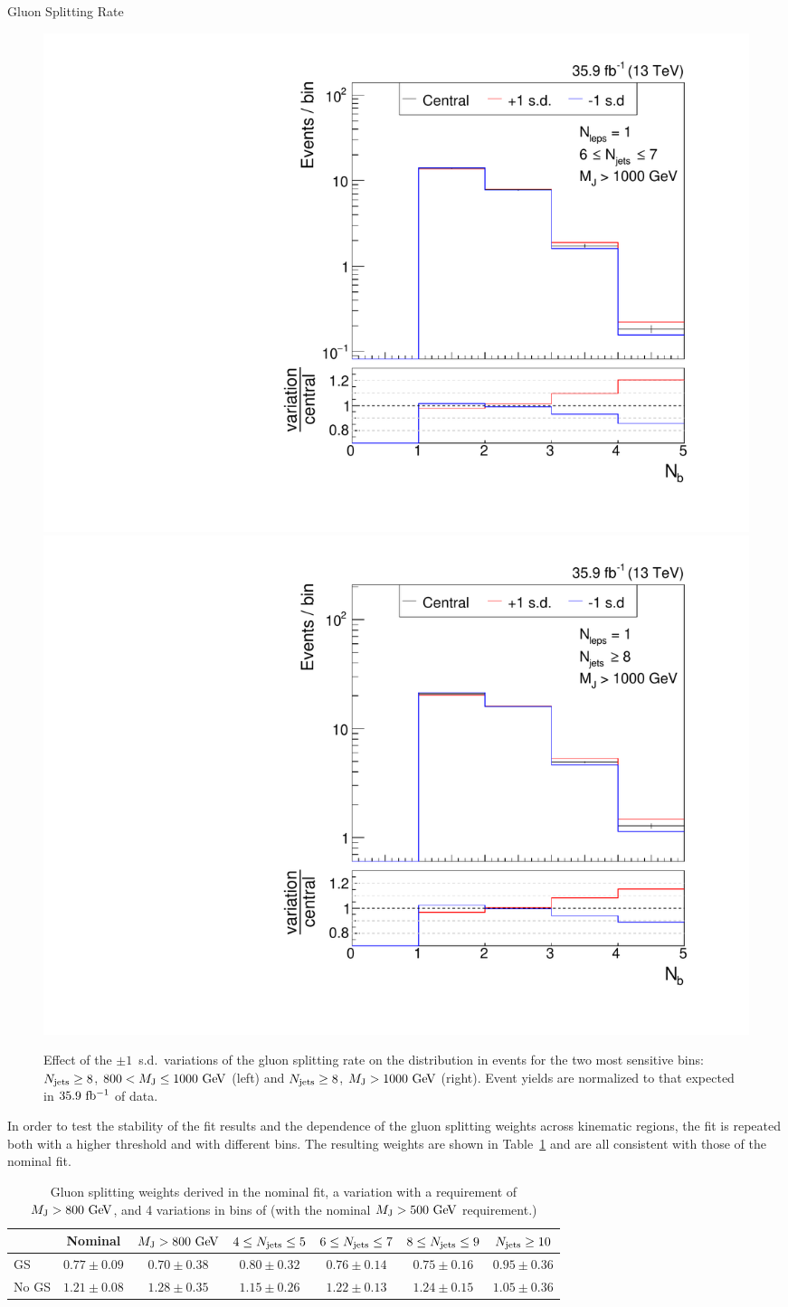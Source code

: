 \begin{section}{Gluon Splitting Rate}
\begin{figure}[tbp!]
\begin{center}
\includegraphics[angle=0,width=0.45\columnwidth]{fig/bin20_ttbar_gs_mconly.pdf}
\includegraphics[angle=0,width=0.45\columnwidth]{fig/bin21_ttbar_gs_mconly.pdf}
\end{center}
\caption{Effect of the $\pm 1$~s.d.\ variations of the gluon splitting rate on the \Nb distribution in \ttbar events for the two most sensitive bins: $N_{\mathrm{jets}} \geq 8$, $800 < M_{\mathrm{J}} \leq 1000~\mathrm{Ge\kern -0.1em V}$ (left) and $N_{\mathrm{jets}} \geq 8$, $M_{\mathrm{J}} > 1000~\mathrm{Ge\kern -0.1em V}$ (right).
Event yields are normalized to that expected in $35.9~\mathrm{fb^{-1}}$ of data.}
\label{fig:gs_variations}
\end{figure}

In order to test the stability of the fit results and the dependence of the gluon splitting weights across kinematic regions, the \dRbb fit is repeated both with a higher \MJ threshold and with different \Njets bins. 
The resulting weights are shown in Table~\ref{tab:gs_variations} and are all consistent with those of the nominal fit.

\begin{table}[tb!]
\setlength\tabcolsep{3pt}
\centering
\begin{tabular}{l|cccccc}
 & Nominal & $M_{\mathrm{J}} > 800~\mathrm{Ge\kern -0.1em V}$ & $4 \leq N_{\mathrm{jets}} \leq 5$ & $6 \leq N_{\mathrm{jets}} \leq 7$ & $8 \leq N_{\mathrm{jets}} \leq 9$ & $N_{\mathrm{jets}} \geq 10$ \\
\hline
GS    & $0.77 \pm 0.09$ & $0.70 \pm 0.38$ & $ 0.80 \pm 0.32$  & $ 0.76 \pm 0.14$ & $ 0.75 \pm 0.16$  & $ 0.95 \pm 0.36$ \\
No GS & $1.21 \pm 0.08$ & $1.28 \pm 0.35$ & $ 1.15 \pm 0.26$  & $ 1.22 \pm 0.13$ & $ 1.24 \pm 0.15$  & $ 1.05 \pm 0.36$ \\
\end{tabular}
\caption{Gluon splitting weights derived in the nominal fit, a variation with a requirement of $M_{\mathrm{J}} > 800~\mathrm{Ge\kern -0.1em V}$, and 4 variations in bins of \Njets (with the nominal $M_{\mathrm{J}} > 500~\mathrm{Ge\kern -0.1em V}$ requirement.)}
\label{tab:gs_variations}
\end{table}

\end{section}

